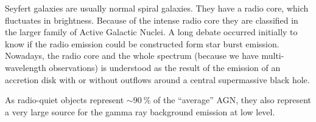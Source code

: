 \documentclass[10pt,a4paper,english]{article}
\begin{document}
Seyfert galaxies are usually normal spiral galaxies. They have a radio core,
which fluctuates in brightness. Because of the intense radio core they are
classified in the larger family of Active Galactic Nuclei. A long debate
occurred initially to know if the radio emission could be constructed form star
burst emission. Nowadays, the radio core and the whole spectrum (because we
have multi-wavelength observations) is understood as the result of the emission
of an accretion disk with or without outflows around a central supermassive
black hole.

As radio-quiet objects represent $\sim \SI{90}{\percent}$ of the “average” AGN,
they also represent a very large source for the gamma ray background emission
at low level.

\begin{figure}[!ht]
    \noindent
    \begin{minipage}{.49\textwidth}


\end{minipage}
\end{figure}
\end{document}
